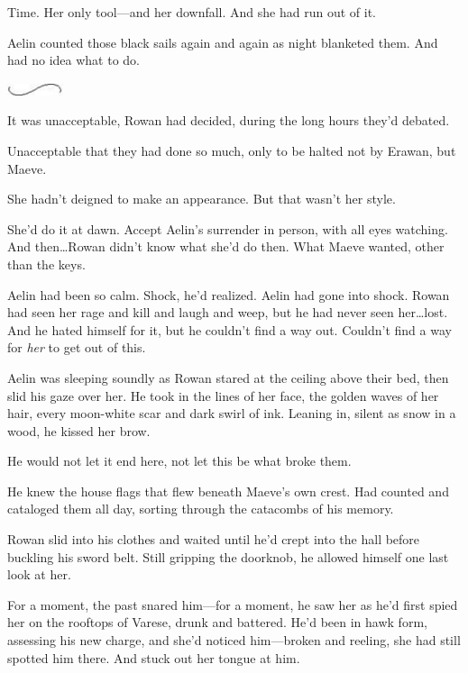 Time.
Her only tool---and her downfall.
And she had run out of it.

Aelin counted those black sails again and again as night blanketed them.
And had no idea what to do.

\begin{center}
	\includegraphics[width=0.65in,height=0.13in]{images/seperator}
\end{center}

It was unacceptable, Rowan had decided, during the long hours they'd debated.

Unacceptable that they had done so much, only to be halted not by Erawan, but Maeve.

She hadn't deigned to make an appearance.
But that wasn't her style.

She'd do it at dawn.
Accept Aelin's surrender in person, with all eyes watching.
And then\ldots Rowan didn't know what she'd do then.
What Maeve wanted, other than the keys.

Aelin had been so calm.
Shock, he'd realized.
Aelin had gone into shock.
Rowan had seen her rage and kill and laugh and weep, but he had never seen her\ldots lost.
And he hated himself for it, but he couldn't find a way out.
Couldn't find a way for \emph{her} to get out of this.

Aelin was sleeping soundly as Rowan stared at the ceiling above their bed, then slid his gaze over her.
He took in the lines of her face, the golden waves of her hair, every moon-white scar and dark swirl of ink.
Leaning in, silent as snow in a wood, he kissed her brow.

He would not let it end here, not let this be what broke them.

He knew the house flags that flew beneath Maeve's own crest.
Had counted and cataloged them all day, sorting through the catacombs of his memory.

Rowan slid into his clothes and waited until he'd crept into the hall before buckling his sword belt.
Still gripping the doorknob, he allowed himself one last look at her.

For a moment, the past snared him---for a moment, he saw her as he'd first spied her on the rooftops of Varese, drunk and battered.
He'd been in hawk form, assessing his new charge, and she'd noticed him---broken and reeling, she had still spotted him there.
And stuck out her tongue at him.

